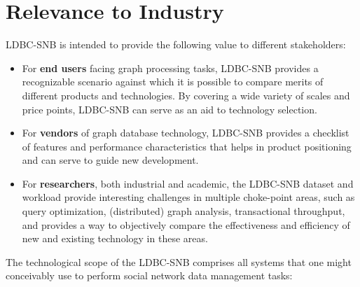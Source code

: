 \section{Relevance to Industry}

LDBC-SNB is intended to provide the following value to different stakeholders:

\begin{itemize}
 \item For \textbf{end users} facing graph processing tasks, LDBC-SNB provides
     a recognizable scenario against which it is possible to compare merits of
     different products and technologies.  By covering a wide variety of scales
     and price points, LDBC-SNB can serve as an aid to technology selection.
 \item For \textbf{vendors} of graph database technology, LDBC-SNB provides a
     checklist of features and performance characteristics that helps in
     product positioning and can serve to guide new development.
 \item For \textbf{researchers}, both industrial and academic, the LDBC-SNB
     dataset and workload provide interesting challenges in multiple
     choke-point areas, such as query optimization, (distributed) graph
     analysis, transactional throughput, and provides a way to objectively
     compare the effectiveness and efficiency of new and existing technology in
     these areas.
\end{itemize}

The technological scope of the LDBC-SNB comprises all systems that one might
conceivably use to perform social network data management tasks:

